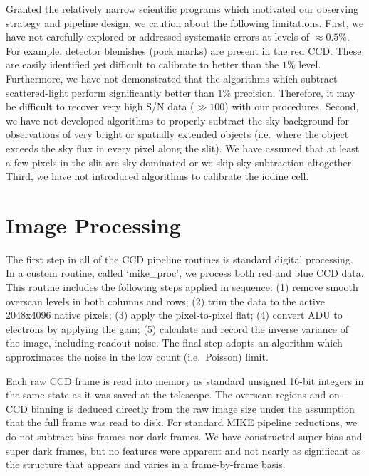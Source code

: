 \documentclass[12pt,preprint]{aastex}
\begin{document}
Granted the relatively narrow scientific programs which
motivated our observing strategy and pipeline design,
we caution about the following limitations.
First, we have not carefully explored or addressed 
systematic errors at levels of $\approx 0.5\%$.
For example, detector blemishes (pock marks) are present in 
the red CCD.  These are easily identified yet difficult to
calibrate to better than the $1\%$ level.  Furthermore,
we have not demonstrated that the algorithms which subtract
scattered-light perform significantly better than $1\%$ precision.
Therefore, it may be difficult to recover very high S/N data
($\gg 100$) with our procedures.
Second, we have not developed algorithms to properly subtract
the sky background for observations of very bright
or spatially extended objects (i.e.\ where the object 
exceeds the sky flux in every pixel along the slit).
We have assumed that at least a few pixels in the slit are
sky dominated or we skip sky subtraction altogether.
Third, we have not introduced algorithms to calibrate
the iodine cell. %


\section{Image Processing}
\label{sec:proc}

The first step in all of the CCD pipeline routines is standard
digital processing.  In a custom routine, called `mike\_proc',
we process both red and blue CCD data. 
This routine includes the following steps applied in sequence:
(1) remove smooth overscan levels in both columns and rows;
(2) trim the data to the active 2048x4096 native pixels;
(3) apply the pixel-to-pixel flat; %
(4) convert ADU to electrons by applying the gain; 
(5) calculate and record the inverse variance of the image, 
including readout noise. 
The final step adopts an algorithm which 
approximates the noise in the low count (i.e.\ Poisson) limit.

Each raw CCD frame is read into memory as standard unsigned 16-bit integers 
in the same state as it was saved at the telescope.  The overscan regions
and on-CCD binning is deduced directly from the raw image size
under the assumption that the full frame was read to disk.
For standard MIKE pipeline reductions, we do not subtract bias frames nor
dark frames.  We have constructed super bias and super dark frames, but no
features were apparent and not nearly as significant as the structure that
appears and varies in a frame-by-frame basis.  
\end{document}
